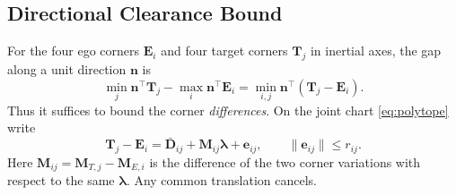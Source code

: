 \documentclass[journal]{IEEEtran}
\theoremstyle{definition}
\newcommand{\vct}[1]{\boldsymbol{#1}}
\newcommand{\mtx}[1]{\mathbf{#1}}
\begin{document}
\subsection{Directional Clearance Bound}\label{subsec:robust}
For the four ego corners $\vct E_i$ and four target corners $\vct T_j$
in inertial axes, the gap along a unit direction $\vct n$ is
\begin{equation*}
 \min_j\vct n^\top\vct T_j-\max_i\vct n^\top\vct E_i
 =\min_{i,j}\vct n^\top(\vct T_j-\vct E_i).
\end{equation*}
Thus it suffices to bound the corner \emph{differences}. On the joint
chart \eqref{eq:polytope} write
\begin{equation}\label{eq:cornererror}
 \vct T_j-\vct E_i=\bar{\vct D}_{ij}
       +\mtx M_{ij}\vct\lambda+\vct e_{ij},\qquad
       \|\vct e_{ij}\|\le r_{ij}.
\end{equation}
Here $\mtx M_{ij}=\mtx M_{T,j}-\mtx M_{E,i}$ is the difference of
the two corner variations with respect to the same $\vct\lambda$.
Any common translation cancels.
\end{document}
